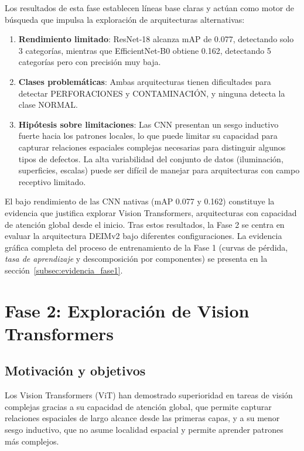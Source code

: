 Los resultados de esta fase establecen líneas base claras y actúan como motor de búsqueda que impulsa la exploración de arquitecturas alternativas:

\begin{enumerate}
    \item \textbf{Rendimiento limitado}: ResNet-18 alcanza mAP de 0.077, detectando solo 3 categorías, mientras que EfficientNet-B0 obtiene 0.162, detectando 5 categorías pero con precisión muy baja.
    \item \textbf{Clases problemáticas}: Ambas arquitecturas tienen dificultades para detectar PERFORACIONES y CONTAMINACIÓN, y ninguna detecta la clase NORMAL.
    \item \textbf{Hipótesis sobre limitaciones}: Las CNN presentan un sesgo inductivo fuerte hacia los patrones locales, lo que puede limitar su capacidad para capturar relaciones espaciales complejas necesarias para distinguir algunos tipos de defectos. La alta variabilidad del conjunto de datos (iluminación, superficies, escalas) puede ser difícil de manejar para arquitecturas con campo receptivo limitado.
\end{enumerate}

El bajo rendimiento de las CNN nativas (mAP 0.077 y 0.162) constituye la evidencia que justifica explorar Vision Transformers, arquitecturas con capacidad de atención global desde el inicio. Tras estos resultados, la Fase 2 se centra en evaluar la arquitectura DEIMv2 bajo diferentes configuraciones. La evidencia gráfica completa del proceso de entrenamiento de la Fase 1 (curvas de pérdida, \textit{tasa de aprendizaje} y descomposición por componentes) se presenta en la sección~\ref{subsec:evidencia_fase1}.


\section{Fase 2: Exploración de Vision Transformers}
\label{sec:fase2}

\subsection{Motivación y objetivos}

Los Vision Transformers (\acrshort{ViT}) han demostrado superioridad en tareas de visión complejas gracias a su capacidad de atención global, que permite capturar relaciones espaciales de largo alcance desde las primeras capas, y a su menor sesgo inductivo, que no asume localidad espacial y permite aprender patrones más complejos.

